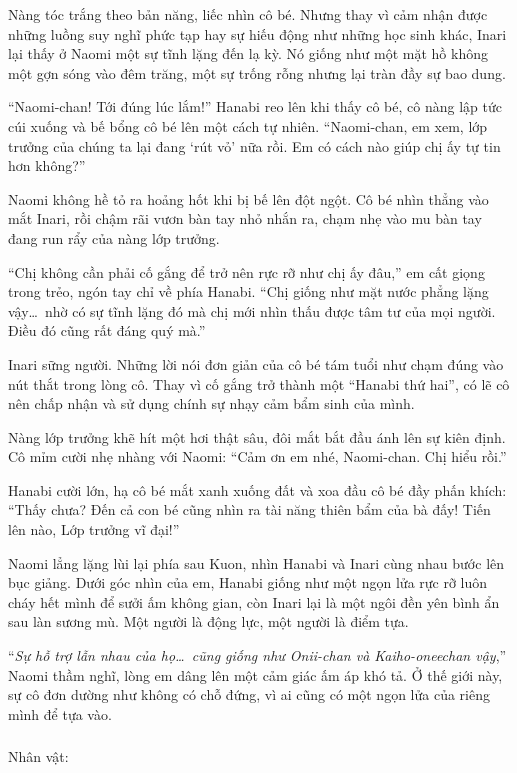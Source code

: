 \documentclass[../main.tex]{subfiles}
\begin{document}
Nàng tóc trắng theo bản năng, liếc nhìn cô bé. Nhưng thay vì cảm nhận được những luồng suy nghĩ phức tạp hay sự hiếu động như những học sinh khác, Inari lại thấy ở Naomi một sự tĩnh lặng đến lạ kỳ. Nó giống như một mặt hồ không một gợn sóng vào đêm trăng, một sự trống rỗng nhưng lại tràn đầy sự bao dung.

``Naomi-chan! Tới đúng lúc lắm!'' Hanabi reo lên khi thấy cô bé, cô nàng lập tức cúi xuống và bế bổng cô bé lên một cách tự nhiên. ``Naomi-chan, em xem, lớp trưởng của chúng ta lại đang `rút vỏ' nữa rồi. Em có cách nào giúp chị ấy tự tin hơn không?''

Naomi không hề tỏ ra hoảng hốt khi bị bế lên đột ngột. Cô bé nhìn thẳng vào mắt Inari, rồi chậm rãi vươn bàn tay nhỏ nhắn ra, chạm nhẹ vào mu bàn tay đang run rẩy của nàng lớp trưởng.

``Chị không cần phải cố gắng để trở nên rực rỡ như chị ấy đâu,'' em cất giọng trong trẻo, ngón tay chỉ về phía Hanabi. ``Chị giống như mặt nước phẳng lặng vậy\dots\ nhờ có sự tĩnh lặng đó mà chị mới nhìn thấu được tâm tư của mọi người. Điều đó cũng rất đáng quý mà.''

Inari sững người. Những lời nói đơn giản của cô bé tám tuổi như chạm đúng vào nút thắt trong lòng cô. Thay vì cố gắng trở thành một ``Hanabi thứ hai'', có lẽ cô nên chấp nhận và sử dụng chính sự nhạy cảm bẩm sinh của mình.

Nàng lớp trưởng khẽ hít một hơi thật sâu, đôi mắt bắt đầu ánh lên sự kiên định. Cô mỉm cười nhẹ nhàng với Naomi: ``Cảm ơn em nhé, Naomi-chan. Chị hiểu rồi.''

Hanabi cười lớn, hạ cô bé mắt xanh xuống đất và xoa đầu cô bé đầy phấn khích: ``Thấy chưa? Đến cả con bé cũng nhìn ra tài năng thiên bẩm của bà đấy! Tiến lên nào, Lớp trưởng vĩ đại!''

Naomi lẳng lặng lùi lại phía sau Kuon, nhìn Hanabi và Inari cùng nhau bước lên bục giảng. Dưới góc nhìn của em, Hanabi giống như một ngọn lửa rực rỡ luôn cháy hết mình để sưởi ấm không gian, còn Inari lại là một ngôi đền yên bình ẩn sau làn sương mù. Một người là động lực, một người là điểm tựa.

``\textit{Sự hỗ trợ lẫn nhau của họ\dots\ cũng giống như Onii-chan và Kaiho-oneechan vậy},'' Naomi thầm nghĩ, lòng em dâng lên một cảm giác ấm áp khó tả. Ở thế giới này, sự cô đơn dường như không có chỗ đứng, vì ai cũng có một ngọn lửa của riêng mình để tựa vào.

\newpage

\subsubsection*{\label{ep-ER9}}
\begin{center}{\caviar Nhân vật:   }\end{center}
\end{document}
